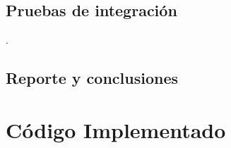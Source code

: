 \documentclass[10pt]{article}
\begin{document}
\subsection{Pruebas de integración}
.
\subsection{Reporte y conclusiones}


\appendix
\section{Código Implementado}



\end{document}
